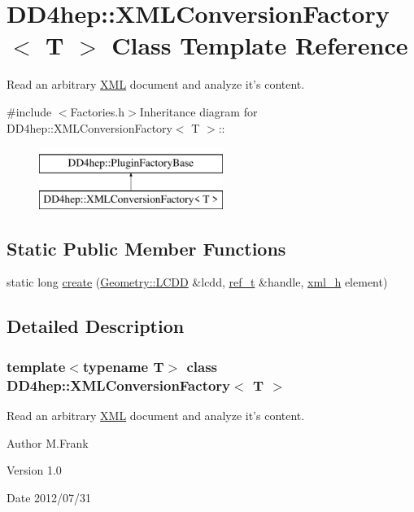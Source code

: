\hypertarget{class_d_d4hep_1_1_x_m_l_conversion_factory}{
\section{DD4hep::XMLConversionFactory$<$ T $>$ Class Template Reference}
\label{class_d_d4hep_1_1_x_m_l_conversion_factory}
}


Read an arbitrary \hyperlink{namespace_d_d4hep_1_1_x_m_l}{XML} document and analyze it's content.  


{\ttfamily \#include $<$Factories.h$>$}Inheritance diagram for DD4hep::XMLConversionFactory$<$ T $>$::\begin{figure}[H]
\begin{center}
\leavevmode
\includegraphics[height=2cm]{class_d_d4hep_1_1_x_m_l_conversion_factory}
\end{center}
\end{figure}
\subsection*{Static Public Member Functions}
\begin{DoxyCompactItemize}
\item 
static long \hyperlink{class_d_d4hep_1_1_x_m_l_conversion_factory_af1d0a581aaec7bc8a40aeb01e6b2929e}{create} (\hyperlink{class_d_d4hep_1_1_geometry_1_1_l_c_d_d}{Geometry::LCDD} \&lcdd, \hyperlink{class_d_d4hep_1_1_handle}{ref\_\-t} \&handle, \hyperlink{class_d_d4hep_1_1_x_m_l_1_1_handle__t}{xml\_\-h} element)
\end{DoxyCompactItemize}


\subsection{Detailed Description}
\subsubsection*{template$<$typename T$>$ class DD4hep::XMLConversionFactory$<$ T $>$}

Read an arbitrary \hyperlink{namespace_d_d4hep_1_1_x_m_l}{XML} document and analyze it's content. \begin{DoxyAuthor}{Author}
M.Frank 
\end{DoxyAuthor}
\begin{DoxyVersion}{Version}
1.0 
\end{DoxyVersion}
\begin{DoxyDate}{Date}
2012/07/31 
\end{DoxyDate}


